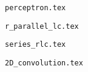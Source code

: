 \documentclass{article}
\begin{document}
\begin{figure}
  \centering
  
  \caption{\texttt{perceptron.tex}}
\end{figure}

\begin{figure}
  \centering
  
  \caption{\texttt{r\_parallel\_lc.tex}}
\end{figure}

\begin{figure}
  \centering
  
  \caption{\texttt{series\_rlc.tex}}
\end{figure}

\begin{figure}
  \centering
  \resizebox{\textwidth}{!}{
  
  }
  \caption{\texttt{2D\_convolution.tex}}
\end{figure}
\end{document}
